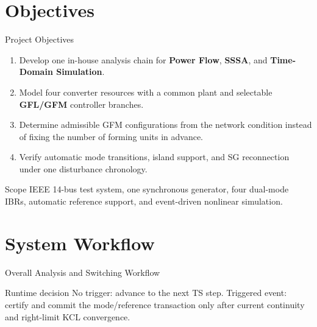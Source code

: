 \documentclass{beamer}
\begin{document}
\section{Objectives}
\begin{frame}{Project Objectives}
\small
\begin{enumerate}
  \item Develop one in-house analysis chain for \textbf{Power Flow}, \textbf{SSSA}, and \textbf{Time-Domain Simulation}.
  \item Model four converter resources with a common plant and selectable \textbf{GFL/GFM} controller branches.
  \item Determine admissible GFM configurations from the network condition instead of fixing the number of forming units in advance.
  \item Verify automatic mode transitions, island support, and SG reconnection under one disturbance chronology.
\end{enumerate}
\vspace{0.35cm}
\begin{block}{Scope}
IEEE 14-bus test system, one synchronous generator, four dual-mode IBRs, automatic reference support, and event-driven nonlinear simulation.
\end{block}
\end{frame}

\section{System Workflow}
\begin{frame}{Overall Analysis and Switching Workflow}
\centering
{}
\vspace{0.35cm}
\begin{block}{Runtime decision}
\footnotesize No trigger: advance to the next TS step. Triggered event: certify and commit the mode/reference transaction only after current continuity and right-limit KCL convergence.
\end{block}
\end{frame}
\end{document}
